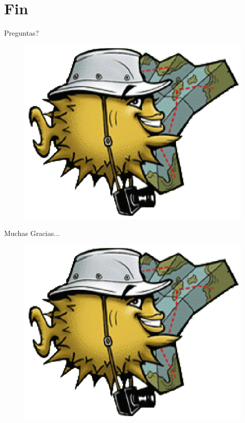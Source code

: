 \documentclass[xcolor=dvipsnames]{beamer}
\begin{document}
\section{Fin}	
	\begin{frame}{
	\begin{center} 
		Preguntas? \\	
	\begin{figure}
	\centering 
		\includegraphics[scale=0.32]{puffyroute.eps}
	\end{figure}
	\end{center}
	}
	\end{frame}
	
	\begin{frame}{
	\begin{center} 
		Muchas Gracias... \\	
	\begin{figure}
	\centering 
		\includegraphics[scale=0.32]{puffyroute.eps}
	\end{figure}
	\end{center}
	}
	\end{frame}
\end{document}
